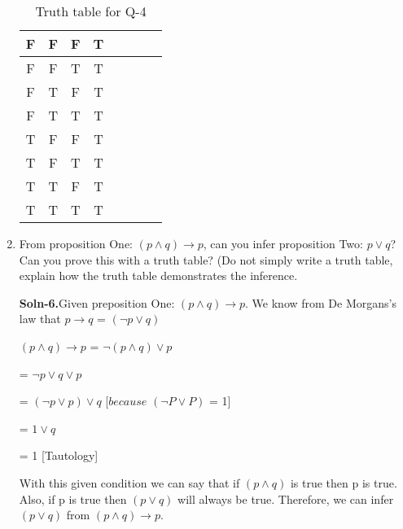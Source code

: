 \documentclass{article}
\begin{document}
\begin{enumerate}
\begin{table} [H]
\begin{tabular}{ | c | c | c | c | c | c | c | c | }
                \hline 
                F & F & F & T \\
                \hline
                F & F & T & T \\
                \hline
                F & T & F & T \\
                \hline
                F & T & T & T \\
                \hline
                T & F & F & T \\
                \hline
                T & F & T & T \\
                \hline
                T & T & F & T \\
                \hline
                T & T & T & T \\ [1ex]
                \hline
                \end{tabular}
                \caption{Truth table for Q-4}
                \label {table:5}
        \end{table}

\item   From proposition One: $(p \wedge q) \rightarrow p$, can you infer
        proposition Two: $p \vee q$?  Can you prove this with a truth
        table?  (Do not simply write a truth table, explain how the
        truth table demonstrates the inference.

        \textbf{Soln-6.}Given preposition One: $(p \wedge q) \rightarrow p$.
                        We know from De Morgans’s law that $p \rightarrow q$ = $(\neg p \vee q)$ \par
                        $(p \wedge q) \rightarrow p$ = $\neg (p \wedge q) \vee p$ \par
                                     = $\neg p \vee q \vee p$ \par
                                     = $(\neg p \vee p) \vee q$ [$ because $ $(\neg P \vee P)$ = 1] \par
                                     = $1 \vee q$ \par
                                     = 1 [Tautology] \par
        With this given condition we can say that if $(p \wedge q)$ is true then p is true. 
        Also, if p is true then $(p \vee q)$ will always be true. Therefore, we can infer $(p \vee q)$ from $(p \wedge q) \rightarrow p$.


\end{enumerate}
\end{document}
